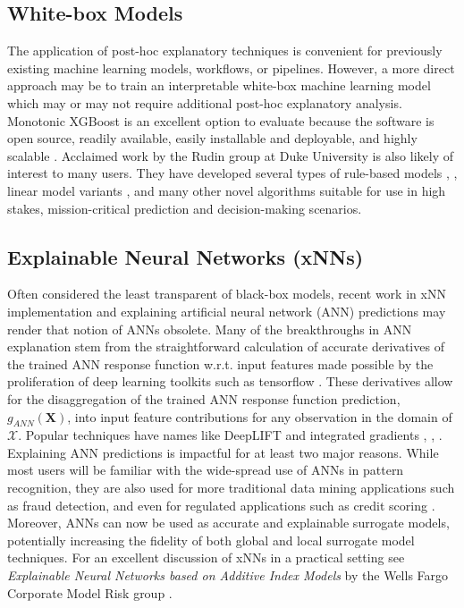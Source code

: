 \documentclass[11pt]{asaproc}
\begin{document}
\subsection{White-box Models}

The application of post-hoc explanatory techniques is convenient for previously existing machine learning models, workflows, or pipelines. However, a more direct approach may be to train an interpretable white-box machine learning model which may or may not require additional post-hoc explanatory analysis. Monotonic XGBoost is an excellent option to evaluate because the software is open source, readily available, easily installable and deployable, and highly scalable \cite{xgboost}. Acclaimed work by the Rudin group at Duke University is also likely of interest to many users. They have developed several types of rule-based models \cite{corels}, \cite{sbrl}, linear model variants \cite{slim}, and many other novel algorithms suitable for use in high stakes, mission-critical prediction and decision-making scenarios. 

\subsection{Explainable Neural Networks (xNNs)}

Often considered the least transparent of black-box models, recent work in xNN implementation and explaining artificial neural network (ANN) predictions may render that notion of ANNs obsolete. Many of the breakthroughs in ANN explanation stem from the straightforward calculation of accurate derivatives of the trained ANN response function w.r.t. input features made possible by the proliferation of deep learning toolkits such as tensorflow \cite{raissi2017physics}. These derivatives allow for the disaggregation of the trained ANN response function prediction, $g_{ANN}(\mathbf{X})$, into input feature contributions for any observation in the domain of $\mathcal{X}$. Popular techniques have names like DeepLIFT and integrated gradients \cite{deeplift}, \cite{integrated_grads}, \cite{grad_attr}. Explaining ANN predictions is impactful for at least two major reasons. While most users will be familiar with the wide-spread use of ANNs in pattern recognition, they are also used for more traditional data mining applications such as fraud detection, and even for regulated applications such as credit scoring \cite{mli_booklet}. Moreover, ANNs can now be used as accurate and explainable surrogate models, potentially increasing the fidelity of both global and local surrogate model techniques. For an excellent discussion of xNNs in a practical setting see \textit{Explainable Neural Networks based on Additive Index Models} by the Wells Fargo Corporate Model Risk group \cite{wf_xnn}.
\end{document}
